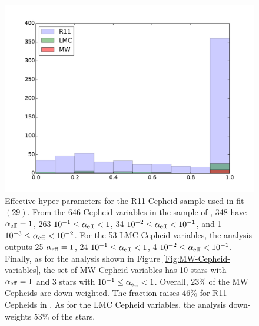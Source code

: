 \begin{figure}[hbtp]
\centering
\includegraphics[width=\textwidth]{figures/chapter-h0/effective_HP_histogram.pdf}
\caption{Effective hyper-parameters for the R11 Cepheid sample used in fit $(29)$. From the 646 Cepheid variables in the sample of \cite{Riess:2011yx}, 348 have $\alpha_{\mathrm{eff}}=1$, 263 $10^{-1}\leq \alpha_{\mathrm{eff}} < 1$, 34  $10^{-2}\leq \alpha_{\mathrm{eff}} < 10^{-1}$, and 1 $10^{-3} \leq \alpha_{\mathrm{eff}} < 10^{-2}$. For the 53 LMC Cepheid variables, the analysis outputs 25 $\alpha_{\mathrm{eff}}=1$, 24 $10^{-1}\leq \alpha_{\mathrm{eff}} < 1$, 4  $10^{-2}\leq \alpha_{\mathrm{eff}} < 10^{-1}$. Finally, as for the analysis shown in Figure \ref{Fig:MW-Cepheid-variables}, the set of MW Cepheid variables has 10 stars with $\alpha_{\mathrm{eff}}=1$ and 3 stars with $10^{-1}\leq \alpha_{\mathrm{eff}} < 1$. Overall, $23\%$ of the MW Cepheids are down-weighted. The fraction raises $46\%$ for R11 Cepheids in \cite{Riess:2011yx}. As for the LMC Cepheid variables, the analysis down-weights $53\%$ of the stars.}
\label{Fig:effective-HP-fitM1a}
\end{figure}

